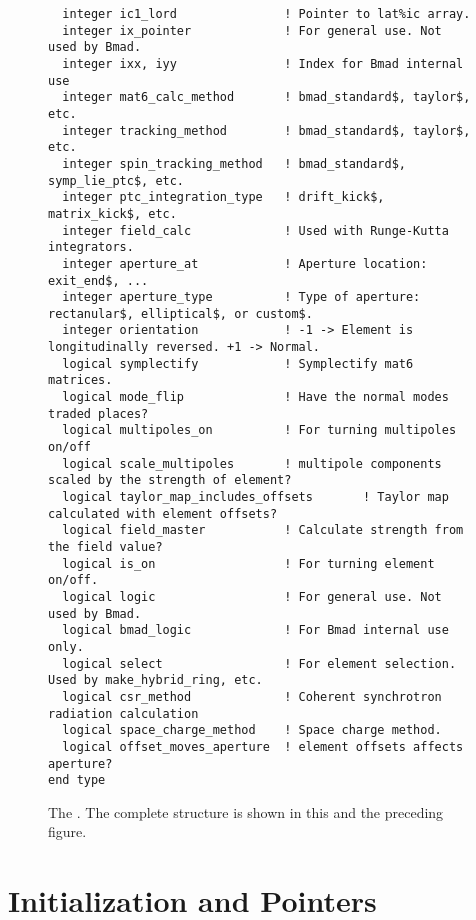 \begin{figure}[tb]
\begin{verbatim}
  integer ic1_lord               ! Pointer to lat%ic array.
  integer ix_pointer             ! For general use. Not used by Bmad.
  integer ixx, iyy               ! Index for Bmad internal use
  integer mat6_calc_method       ! bmad_standard$, taylor$, etc.
  integer tracking_method        ! bmad_standard$, taylor$, etc.
  integer spin_tracking_method   ! bmad_standard$, symp_lie_ptc$, etc.
  integer ptc_integration_type   ! drift_kick$, matrix_kick$, etc.
  integer field_calc             ! Used with Runge-Kutta integrators.
  integer aperture_at            ! Aperture location: exit_end$, ...
  integer aperture_type          ! Type of aperture: rectanular$, elliptical$, or custom$. 
  integer orientation            ! -1 -> Element is longitudinally reversed. +1 -> Normal.
  logical symplectify            ! Symplectify mat6 matrices.
  logical mode_flip              ! Have the normal modes traded places?
  logical multipoles_on          ! For turning multipoles on/off
  logical scale_multipoles       ! multipole components scaled by the strength of element?
  logical taylor_map_includes_offsets       ! Taylor map calculated with element offsets?
  logical field_master           ! Calculate strength from the field value?
  logical is_on                  ! For turning element on/off.
  logical logic                  ! For general use. Not used by Bmad.
  logical bmad_logic             ! For Bmad internal use only.
  logical select                 ! For element selection. Used by make_hybrid_ring, etc.
  logical csr_method             ! Coherent synchrotron radiation calculation
  logical space_charge_method    ! Space charge method.
  logical offset_moves_aperture  ! element offsets affects aperture?          
end type
\end{verbatim}
\caption[The  (part 2).]{The . 
The complete structure is shown in this and the preceding figure.}
\label{f:ele.struct2}
\end{figure}

\section{Initialization and Pointers}

